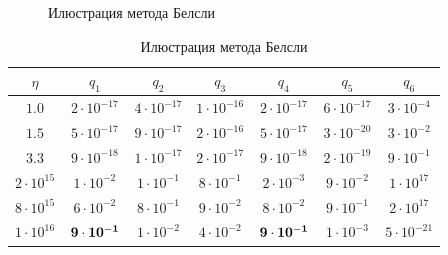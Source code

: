 \begin{figure}[h!t]\center
{}
\caption{Илюстрация метода Белсли}
\label{CovBel}
\end{figure}

\begin{table}[h]
\begin{center}
\caption{Илюстрация метода Белсли}
\begin{tabular}{|c|cccccc|}
\hline
$\eta$ & $q_1$& $q_2$& $q_3$& $q_4$& $q_5$& $q_6$\\
\hline
$1.0$ &  $2\cdot 10^{-17}$ &  $4\cdot 10^{-17}$ &  $1\cdot 10^{-16}$ &  $2\cdot 10^{-17}$ &  $6\cdot 10^{-17}$&  $3\cdot 10^{-4}$ \\
\hline
$1.5$ &  $5\cdot 10^{-17}$ &  $9\cdot 10^{-17}$ &  $2\cdot 10^{-16}$ &  $5\cdot 10^{-17}$ &  $3\cdot 10^{-20}$ &  $3\cdot 10^{-2}$ \\
\hline
$3.3$ &  $9\cdot 10^{-18}$ &  $1\cdot 10^{-17}$ &  $2\cdot 10^{-17}$ &  $9\cdot 10^{-18}$ &  $2\cdot 10^{-19}$ &  $9\cdot 10^{-1}$ \\
\hline
$2\cdot 10^{15}$ &  $1\cdot 10^{-2}$ &  $1\cdot 10^{-1}$ &  $8\cdot 10^{-1}$ &  $2\cdot 10^{-3}$ &  $9\cdot 10^{-2}$ &  $1\cdot 10^{17}$ \\ 
\hline
$8\cdot 10^{15}$ &  $6\cdot 10^{-2}$ &  $8\cdot 10^{-1}$ &  $9\cdot 10^{-2}$ &  $8\cdot 10^{-2}$ &  $9\cdot 10^{-1}$ & $ 2\cdot 10^{17} $\\
\hline
$1\cdot 10^{16}$ &  $\bf9\cdot 10^{-1}$ &  $1\cdot 10^{-2}$& $ 4\cdot 10^{-2}$&  $\bf9\cdot 10^{-1}$ &  $1\cdot 10^{-3}$ & $ 5\cdot 10^{-21}$ \\
\hline
\end{tabular}
\label{CovBelTable}
\end{center}
\end{table}

